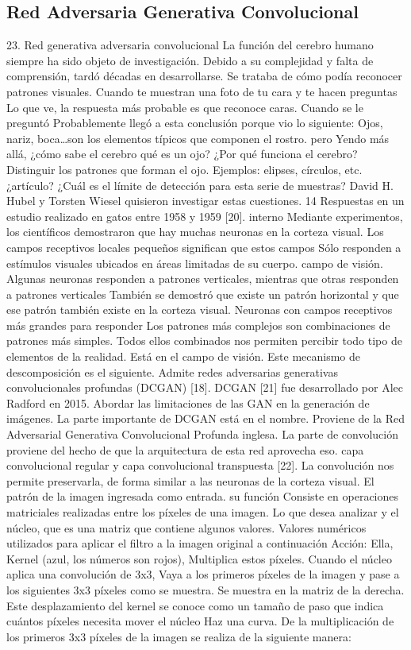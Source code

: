 \subsection{Red Adversaria Generativa Convolucional}\label{sec: Red Adversaria Generativa Convolucional} 
 23. Red generativa adversaria convolucional 
La función del cerebro humano siempre ha sido objeto de investigación. 
Debido a su complejidad y  falta de comprensión, tardó décadas en desarrollarse. 
Se trataba de cómo podía reconocer patrones visuales. 
Cuando te muestran una foto de tu cara y te hacen preguntas 
Lo que ve, la respuesta más probable es que reconoce caras. Cuando se le preguntó 
Probablemente llegó a esta conclusión porque vio lo siguiente: 
Ojos, nariz, boca…son los elementos típicos que componen el rostro. pero 
Yendo más allá, ¿cómo sabe el cerebro qué es un ojo? ¿Por qué funciona el cerebro? 
Distinguir los patrones que forman el ojo. Ejemplos: elipses, círculos, etc. 
¿artículo? ¿Cuál es el límite de detección para esta serie de muestras?
David H. Hubel y Torsten Wiesel quisieron investigar estas cuestiones. 
14 
Respuestas en un estudio realizado en gatos entre 1958 y 1959  [20]. interno 
Mediante experimentos, los científicos demostraron que hay muchas neuronas en la corteza visual. 
Los campos receptivos locales pequeños significan que estos campos 
Sólo responden a estímulos visuales ubicados en áreas limitadas de su cuerpo. 
campo de visión. Algunas neuronas responden a patrones verticales, mientras que otras responden a patrones verticales 
También se demostró que existe un patrón horizontal y  que ese patrón también existe en la corteza visual. 
Neuronas con campos receptivos más grandes para responder 
Los patrones más complejos son combinaciones de patrones más simples. 
Todos ellos combinados nos permiten percibir todo tipo de elementos de la realidad. 
Está en el  campo de visión. Este mecanismo de descomposición es  el siguiente. 
Admite redes adversarias generativas convolucionales profundas 
(DCGAN) [18]. 
DCGAN [21] fue desarrollado por Alec Radford en 2015. 
Abordar las limitaciones de las GAN en la generación de imágenes. 
La parte importante de  DCGAN está en el nombre. 
Proviene de la Red Adversarial Generativa Convolucional Profunda inglesa. 
 La parte de convolución proviene del hecho de que la arquitectura de esta red aprovecha eso. 
 capa convolucional regular y capa convolucional transpuesta [22]. La convolución nos permite preservarla, de forma similar a las neuronas de la corteza visual. 
El patrón de la imagen ingresada como entrada. su función 
Consiste en operaciones matriciales realizadas entre los píxeles de una imagen. 
 Lo que desea analizar y el núcleo, que es una matriz que contiene algunos valores. 
Valores numéricos utilizados para aplicar el filtro a la imagen original a continuación 
Acción: 
 Ella, Kernel (azul, los números son rojos), 
 Multiplica estos píxeles. Cuando el núcleo aplica una convolución de 3x3, 
 Vaya a  los  primeros píxeles de la imagen y pase a los siguientes 3x3 píxeles como se muestra. 
Se muestra en la matriz de la derecha. Este desplazamiento del kernel se conoce 
como un tamaño de paso que indica cuántos píxeles necesita mover el núcleo 
 Haz una curva.
De la multiplicación de los primeros 3x3 píxeles de la imagen se realiza de la siguiente manera: 

